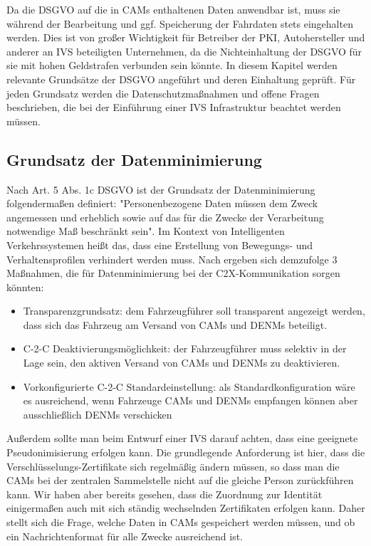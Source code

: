 Da die DSGVO auf die in CAMs enthaltenen Daten anwendbar ist, muss sie während der Bearbeitung und ggf. Speicherung der Fahrdaten stets eingehalten werden. Dies ist von großer Wichtigkeit für Betreiber der PKI, Autohersteller und anderer an IVS beteiligten Unternehmen, da die Nichteinhaltung der DSGVO für sie mit hohen Geldstrafen verbunden sein könnte. In diesem Kapitel werden relevante Grundsätze der DSGVO angeführt und deren Einhaltung geprüft. Für jeden Grundsatz werden die Datenschutzmaßnahmen und offene Fragen beschrieben, die bei der Einführung einer IVS Infrastruktur beachtet werden müssen. 

\subsection{Grundsatz der Datenminimierung}

Nach Art. 5 Abs. 1c DSGVO ist der Grundsatz der Datenminimierung folgendermaßen definiert: "Personenbezogene Daten müssen dem Zweck angemessen und erheblich sowie auf das für die Zwecke der Verarbeitung notwendige Maß beschränkt sein". Im Kontext von Intelligenten Verkehrssystemen heißt das, dass eine Erstellung von Bewegungs- und Verhaltensprofilen verhindert werden muss. Nach \cite{Kiometzis2017} ergeben sich demzufolge 3 Maßnahmen, die für Datenminimierung bei der C2X-Kommunikation sorgen könnten:
\begin{itemize}
	\item Transparenzgrundsatz: dem Fahrzeugführer soll transparent angezeigt werden, dass sich das Fahrzeug am Versand von CAMs und DENMs beteiligt. 
	\item C-2-C Deaktivierungsmöglichkeit: der Fahrzeugführer muss selektiv in der Lage sein, den aktiven Versand von CAMs und DENMs zu deaktivieren.
	\item Vorkonfigurierte C-2-C Standardeinstellung: als Standardkonfiguration wäre es ausreichend, wenn Fahrzeuge CAMs und DENMs empfangen können aber ausschließlich DENMs verschicken
\end{itemize}

Außerdem sollte man beim Entwurf einer IVS darauf achten, dass eine geeignete Pseudonimisierung erfolgen kann. Die grundlegende Anforderung ist hier, dass die Verschlüsselungs-Zertifikate sich regelmäßig ändern müssen, so dass man die CAMs bei der zentralen Sammelstelle nicht auf die gleiche Person zurückführen kann. Wir haben aber bereits gesehen, dass die Zuordnung zur Identität einigermaßen auch mit sich ständig wechselnden Zertifikaten erfolgen kann. Daher stellt sich die Frage, welche Daten in CAMs gespeichert werden müssen, und ob ein Nachrichtenformat für alle Zwecke ausreichend ist.

